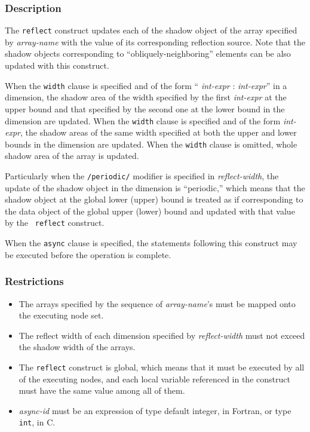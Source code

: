 \subsubsection*{Description}

The {\tt reflect} construct updates each of the shadow object of the
array specified by {\it array-name} with the value of its corresponding
reflection source. Note that the shadow objects corresponding to
``obliquely-neighboring'' elements can be also updated with this
construct.


When the {\tt width} clause is specified and of the form ``{\it
int-expr} : {\it int-expr}'' in a dimension, the shadow area of the
width specified by the first {\it int-expr} at the upper bound and that
specified by the second one at the lower bound in the dimension are
updated.
%
When the {\tt width} clause is specified and of the form {\it int-expr},
the shadow areas of the same width specified at both the upper
and lower bounds in the dimension are updated.
%
When the {\tt width} clause is omitted, whole shadow area of the array
is updated.

Particularly when the {\tt /periodic/} modifier is specified in {\it
reflect-width}, the update of the shadow object in the dimension is
``periodic,'' which means that the shadow object at the global lower
(upper) bound is treated as if corresponding to the data object of the
global upper (lower) bound and updated with that value by the {\tt
reflect} construct.

When the {\tt async} clause is specified, the statements following this
construct may be executed before the operation is complete.

\subsubsection*{Restrictions}

\begin{itemize}
 \item The arrays specified by the sequence of {\it array-name}'s must
       be mapped onto the executing node set.
 \item The reflect width of each dimension specified by {\it
       reflect-width} must not exceed the shadow width of the arrays.
 \item The {\tt reflect} construct is global, which means that it must be
       executed by all of the executing nodes, and each local variable
       referenced in the construct must have the same value among all of
       them.
 \item {\it async-id} must be an expression of type default integer, in
       Fortran, or type {\tt int}, in C.
\end{itemize}

